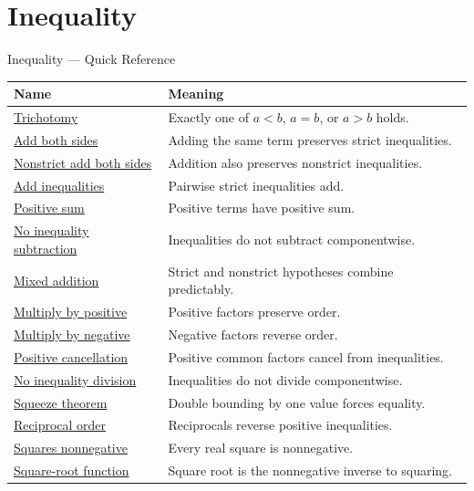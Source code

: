\section{Inequality}

\begin{toolkitbox}{Inequality --- Quick Reference}
\small
\begin{tabular}{l l}
\toprule
\textbf{Name} & \textbf{Meaning}\\
\midrule
\hyperref[thm:real-order-trichotomy]{Trichotomy} & Exactly one of $a<b$, $a=b$, or $a>b$ holds.\\
\hyperref[thm:ineq-add-both-sides]{Add both sides} & Adding the same term preserves strict inequalities.\\
\hyperref[thm:ineq-nonstrict-add-both-sides]{Nonstrict add both sides} & Addition also preserves nonstrict inequalities.\\
\hyperref[thm:ineq-add-inequalities]{Add inequalities} & Pairwise strict inequalities add.\\
\hyperref[lem:positive-sum]{Positive sum} & Positive terms have positive sum.\\
\hyperref[prop:subtraction-of-inequalities-not-valid]{No inequality subtraction} & Inequalities do not subtract componentwise.\\
\hyperref[thm:ineq-mixed-add]{Mixed addition} & Strict and nonstrict hypotheses combine predictably.\\
\hyperref[thm:ineq-multiply-positive]{Multiply by positive} & Positive factors preserve order.\\
\hyperref[thm:ineq-multiply-negative]{Multiply by negative} & Negative factors reverse order.\\
\hyperref[lem:positive-multiplication-cancellation]{Positive cancellation} & Positive common factors cancel from inequalities.\\
\hyperref[prop:division-of-inequalities-not-valid]{No inequality division} & Inequalities do not divide componentwise.\\
\hyperref[thm:ineq-squeeze]{Squeeze theorem} & Double bounding by one value forces equality.\\
\hyperref[thm:ineq-reciprocal-positive]{Reciprocal order} & Reciprocals reverse positive inequalities.\\
\hyperref[thm:square-nonnegative]{Squares nonnegative} & Every real square is nonnegative.\\
\hyperref[def:real-square-root-function]{Square-root function} & Square root is the nonnegative inverse to squaring.\\

\end{tabular}
\end{toolkitbox}
